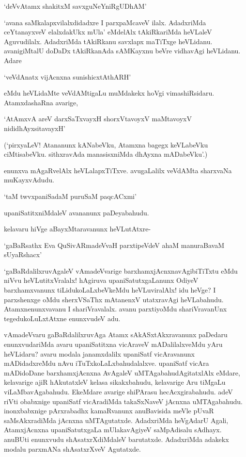 \begin{shloka}
`deVvAtamx shakitxM savxguNeYniRgUDhAM'
\end{shloka}

`avana saMkalapxvilalxdidadxre I parxpaMcaveV ilalx. AdadxriMda ceYtanayxveV elalxdakUkx mUla' eMdelAlx tAkiRkariMda heVLaleV Aguvudilalx. AdadxriMda tAkiRkanu savxlapx maTiTxge heVLidanu. avanigiMtalU doDaDx tAkiRkanAda sAMKayxnu beVre vidhavAgi heVLidanu. Adare

\begin{shloka}
`veVdAnatx vijAcnxna sunishicxtAthARH'
\end{shloka}

eMdu heVLidaMte veVdAMtigaLu muMdakekx hoVgi vimashiRsidaru. AtamxdashaRna avarige,

\begin{shloka}
`AtAmxvA areV darxSaTxvayxH shorxVtavoyxV maMtavoyxV nididhAyxsitavayxH'
\end{shloka}

(`pirxyaLeV! Atananunx kANabeVku, Atamxna bagegx keVLabeVku ciMtisabeVku. sithxravAda manasisxniMda dhAyxna mADabeVku'.)

enunxva mAgaRvelAlx heVLalapxTiTxve. avugaLalilx veVdAMta sharxvaNa muKayxvAdudu.

\begin{shloka}
`taM twvxpaniSadaM puruSaM paqcACxmi'
\end{shloka}

upaniSatitxniMdaleV avananunx paDeyabahudu.

kelavaru hiVge aBayxMtaravanunx heVLutAtxre-

\begin{shloka}
`gaBaRsathx Eva QuSivARmadeVvaH parxtipeVdeV ahaM manuraBavaM sUyaRshacx'
\end{shloka}

`gaBaRdalilxruvAgaleV vAmadeVvarige barxhamxjAcnxnavAgibiTiTxtu eMdu niVvu heVLutitxVralalx! hAgiruva upaniSatutxgaLanunx OdiyeV barxhamxvanunx tiLidukoLaLxbeVkeMdu heVLuviralAlx! idu heVge? I parxshenxge oMdu sherxVSaThx mAtanenxV utatxravAgi heVLabahudu. Atamxnenunxvavanu I shariVravalalx. avanu parxtiyoMdu shariVravanUnx tegedukoLuLxtAtxne enunxvudeV adu.

vAmadeVvaru gaBaRdalilxruvAga Atamx sAkASxtAkxravanunx paDedaru enunxvudariMda avaru upaniSatitxna vicAraveV mADalilalxveMdu yAru heVLidaru? avaru modala janamxdalilx upaniSatf vicAravanunx mADidadxreMdu nAvu iTuTxkoLaLxbahudalalxve. upaniSatf vicAra mADidoDane barxhamxjAcnxna AvAgaleV uMTAgabahudAgitatxlAlx eMdare, kelavarige ajiR hAkutatxleV kelasa sikakxbahudu, kelavarige Aru tiMgaLu viLaMbavAgabahudu. EkeMdare avarige shiPArasu hecAcxgirabahudu. adeV riVti obabxnige upaniSatf vicAradiMda takaSxNaveV jAcnxna uMTAgabahudu. inonxbabxnige pArxrabadhx kamaRvanunx anuBavisida meVle pUvaR saMsAkxradiMda jAcnxna uMTAgutatxde. AdadxriMda heVgAdarU Agali, AtamxjAcnxna upaniSatutxgaLa mUlakavAgiyeV saMpAdisalu sAdhayx. anuBUti enunxvudu shAsatxrXdiMdaleV barutatxde. AdadxriMda adakekx modalu parxmANa shAsatxrXveV Agutatxde.

